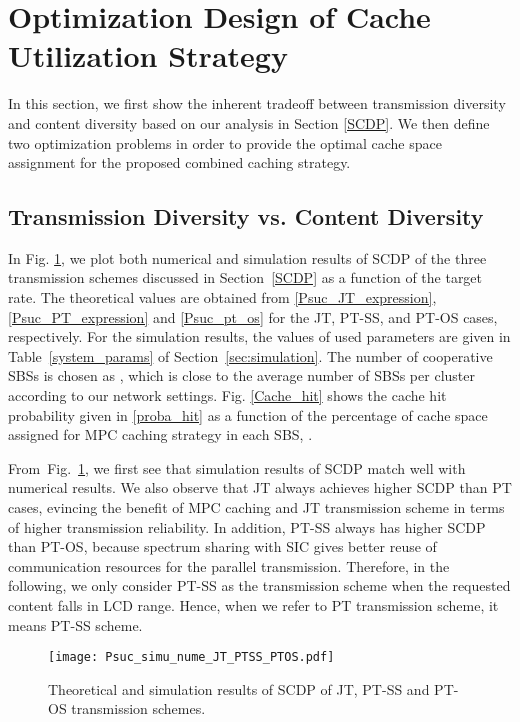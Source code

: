\documentclass[twocolumns,10pt]{IEEEtran}
\begin{document}
\section{Optimization Design of Cache Utilization Strategy}
\label{optimal caching}
In this section, we first show the inherent tradeoff between transmission diversity and content diversity based on our analysis in Section \ref{SCDP}. We then define two optimization problems in order to provide the optimal cache space assignment for the proposed combined caching strategy.

\subsection{Transmission Diversity vs. Content Diversity}	
\label{tradeoff}
In Fig. \ref{Psuc_JT_PT}, we plot both numerical and simulation results of SCDP of the three transmission schemes discussed in Section~\ref{SCDP} as a function of the target rate. The theoretical values are obtained from \eqref{Psuc_JT_expression}, \eqref{Psuc_PT_expression} and \eqref{Psuc_pt_os} for the JT, PT-SS, and PT-OS cases, respectively. For the simulation results, the values of used parameters are given in Table~\ref{system_params} of Section~\ref{sec:simulation}. The number of cooperative SBSs is chosen as , which is close to the average number of SBSs per cluster according to our network settings. 
Fig. \ref{Cache_hit} shows the cache hit probability given in \eqref{proba_hit} as a function of the percentage of cache space assigned for MPC caching strategy in each SBS, . 


From~Fig.~\ref{Psuc_JT_PT}, we first see that simulation results of SCDP match well with numerical results.
We also observe that JT always achieves higher SCDP than PT cases, evincing the benefit of MPC caching and JT transmission scheme in terms of higher transmission reliability.
In addition, PT-SS always has higher SCDP than PT-OS, because spectrum sharing with SIC gives better reuse of communication resources for the parallel transmission. Therefore, in the following, we only consider PT-SS as the transmission scheme when the requested content falls in LCD range. 
Hence, when we refer to PT transmission scheme, it means PT-SS scheme.  



\begin{figure}
	\centering
	\texttt{[image: Psuc\_simu\_nume\_JT\_PTSS\_PTOS.pdf]}
	\caption{Theoretical and simulation results of SCDP of JT, PT-SS and PT-OS transmission schemes.}
	\label{Psuc_JT_PT}
\end{figure}
\end{document}
